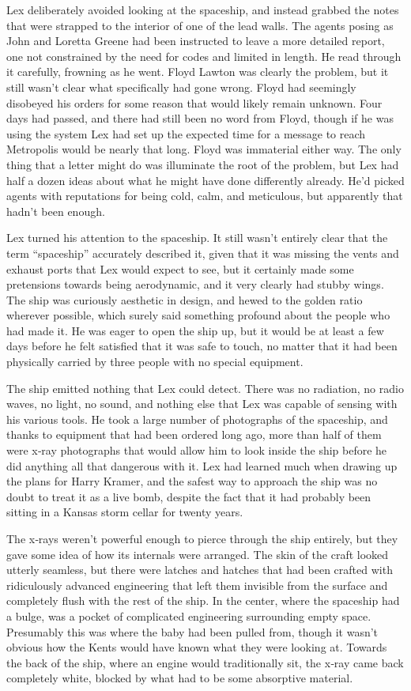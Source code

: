 \documentclass[ebook,12pt]{memoir}
\begin{document}
Lex deliberately avoided looking at the spaceship, and instead grabbed
the notes that were strapped to the interior of one of the lead walls.
The agents posing as John and Loretta Greene had been instructed to
leave a more detailed report, one not constrained by the need for codes
and limited in length. He read through it carefully, frowning as he
went. Floyd Lawton was clearly the problem, but it still wasn't clear
what specifically had gone wrong. Floyd had seemingly disobeyed his
orders for some reason that would likely remain unknown. Four days had
passed, and there had still been no word from Floyd, though if he was
using the system Lex had set up the expected time for a message to reach
Metropolis would be nearly that long. Floyd was immaterial either way.
The only thing that a letter might do was illuminate the root of the
problem, but Lex had half a dozen ideas about what he might have done
differently already. He'd picked agents with reputations for being cold,
calm, and meticulous, but apparently that hadn't been enough.

Lex turned his attention to the spaceship. It still wasn't entirely
clear that the term ``spaceship'' accurately described it, given that it
was missing the vents and exhaust ports that Lex would expect to see,
but it certainly made some pretensions towards being aerodynamic, and it
very clearly had stubby wings. The ship was curiously aesthetic in
design, and hewed to the golden ratio wherever possible, which surely
said something profound about the people who had made it. He was eager
to open the ship up, but it would be at least a few days before he felt
satisfied that it was safe to touch, no matter that it had been
physically carried by three people with no special equipment.

The ship emitted nothing that Lex could detect. There was no radiation,
no radio waves, no light, no sound, and nothing else that Lex was
capable of sensing with his various tools. He took a large number of
photographs of the spaceship, and thanks to equipment that had been
ordered long ago, more than half of them were x‐ray photographs that
would allow him to look inside the ship before he did anything all that
dangerous with it. Lex had learned much when drawing up the plans for
Harry Kramer, and the safest way to approach the ship was no doubt to
treat it as a live bomb, despite the fact that it had probably been
sitting in a Kansas storm cellar for twenty years.

The x‐rays weren't powerful enough to pierce through the ship entirely,
but they gave some idea of how its internals were arranged. The skin of
the craft looked utterly seamless, but there were latches and hatches
that had been crafted with ridiculously advanced engineering that left
them invisible from the surface and completely flush with the rest of
the ship. In the center, where the spaceship had a bulge, was a pocket
of complicated engineering surrounding empty space. Presumably this was
where the baby had been pulled from, though it wasn't obvious how the
Kents would have known what they were looking at. Towards the back of
the ship, where an engine would traditionally sit, the x‐ray came back
completely white, blocked by what had to be some absorptive material.
\end{document}
